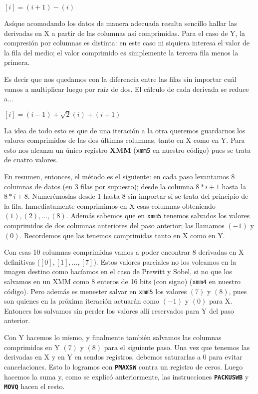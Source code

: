 $ [i] = (i+1) - (i) $

Asíque acomodando los datos de manera adecuada resulta sencillo hallar las derivadas en X
a partir de las columnas así comprimidas. Para el caso de Y, la compresión por columnas
es distinta: en este caso ni siquiera interesa el valor de la fila del medio; el valor
comprimido es simplemente la tercera fila menos la primera.

Es decir que nos quedamos con la diferencia entre las filas sin importar cuál vamos
a multiplicar luego por raíz de dos. El cálculo de cada derivada se reduce a...

$ [i] = (i-1) + \sqrt{2}(i) + (i+1) $

La idea de todo esto es que de una iteración a la otra queremos guardarnos los
valores comprimidos de las dos últimas columnas, tanto en X como en Y. Para esto
nos alcanza un único registro \textbf{XMM} (\texttt{xmm5} en nuestro código) pues
se trata de cuatro valores.

En resumen, entonces, el método es el siguiente: en cada paso levantamos 8 columnas
de datos (en 3 filas por supuesto); desde la columna $ 8*i+1 $ hasta la $ 8*i+8 $.
Numerémoslas desde 1 hasta 8 sin importar si se trata del principio de la fila.
Inmediatamente comprimimos en X esas columnas obteniendo $ (1), (2), ..., (8) $.
Además sabemos que en \texttt{xmm5} tenemos salvados los valores comprimidos de
dos columnas anteriores del paso anterior; las llamamos $ (-1) $ y $ (0) $.
Recordemos que las tenemos comprimidas tanto en X como en Y.

Con esas 10 columnas comprimidas vamos a poder encontrar 8 derivadas en X definitivas
($ [0], [1], ..., [7] $). Estos valores parciales no los volcamos en la imagen destino
como hacíamos en el caso de Prewitt y Sobel, si no que los salvamos en un XMM como
8 enteros de 16 bits (con signo) (\texttt{xmm4} en nuestro código).
Pero además es menester salvar en \texttt{xmm5} los valores
$ (7) $ y $ (8) $, pues son quienes en la próxima iteración actuarán como
$ (-1) $ y $ (0) $ para X. Entonces los salvamos sin perder los valores allí
reservados para Y del paso anterior.

Con Y hacemos lo mismo, y finalmente también salvamos las columnas comprimidas en Y
$ (7) $ y $ (8) $ para el siguiente paso. Una vez que tenemos las derivadas en X y en Y
en sendos registros, debemos saturarlas a 0 para evitar cancelaciones. Esto lo logramos 
con \textbf{\texttt{PMAXSW}} contra un registro de ceros. Luego hacemos la suma y,
como se explicó anteriormente, las instrucciones \textbf{\texttt{PACKUSWB}} y
\textbf{\texttt{MOVQ}} hacen el resto.


